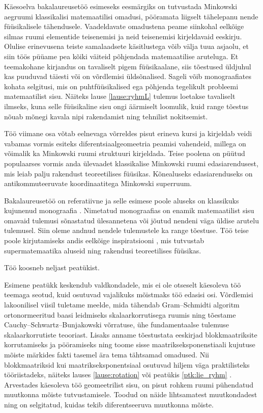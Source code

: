 \documentclass[12pt,a4paper,oneside]{article}
\theoremstyle{plain}
\theoremstyle{definition}
\numberwithin{equation}{section}
\begin{document}
Käesoelva bakalaureusetöö esimeseks eesmärgiks on 
tutvustada Minkowski aeg\-ruumi klassikalisi matemaatilisi 
omadusi, pööramata liigselt tähelepanu nende füü\-sikalisele 
tähendusele. Vaadeldavate omadustena peame siinkohal 
eelkõige silmas ruumi elementide teisenemisi ja neid 
teisenemisi kirjeldavaid eeskirju. 
Olulise erinevusena teiste samalaadsete käsitlustega võib 
välja tuua asjaolu, et siin töös püüame pea kõiki väiteid 
põhjendada matemaatilise aruteluga. Et teemakohane kirjandus 
on tavaliselt pigem füüsikaalane, siis tõestused üldjuhul kas 
puuduvad täiesti või on võrdlemisi üldsõnalised. Sageli võib 
monograafiates kohata selgitusi, mis on puhtfüüsikalised ega 
põhjenda tegelikult probleemi matemaatilist \mbox{sisu}. Näiteks \mbox{lause}
\ref{lause:ryhmL} tulemus loetakse tavaliselt ilmseks, kuna 
selle füüsikaline sisu \mbox{ongi} äärmiselt loomulik, kuid range 
tõestus nõuab mõnegi kavala nipi rakendamist ning tehnilist 
nokitsemist. 

Töö viimane osa võtab eelnevaga võrreldes pisut erineva kursi 
ja kirjeldab \mbox{veidi} vabamas vormis esiteks diferentsiaalgeomeetria 
peamisi vahendeid, millega on võimalik ka Minkowski ruumi 
struktuuri kirjeldada. Teise poolena on püütud populaarses 
vormis anda ülevaadet klassikalise Minkowski ruumi 
edasiarendusest, mis leiab palju rakendust teoreetilises 
füüsikas. Kõnealuseks edasiarenduseks on antikommuteeruvate 
koordinaatitega Minkowski superruum.

Bakalaureusetöö on referatiivne ja selle esimese poole aluseks 
on klassikuks kuju\-nenud monograafia \cite{Naber}. Nimetatud monograafias
on enamik matemaatilist sisu omavaid tulemusi sõnastatud 
ülesannetena või jõutud nendeni väga üldise arutelu tulemusel. 
Siin oleme andnud nendele tulemustele ka range tõestuse. Töö 
teise poole kirjutamiseks andis eelkõige inspiratsiooni 
\cite{Super}, mis tutvustab super\-matemaatika aluseid ning 
rakendusi teoreetilises füüsikas.

Töö koosneb neljast peatükist.

Esimene peatükk keskendub valdkondadele, mis ei ole otseselt 
käesoleva töö \mbox{teemaga} seotud, kuid osutuvad vajalikuks 
mõistmaks töö edasisi osi. Võrdlemisi lakoonilisel 
viisil tuletame meelde, mida tähendab Gram--Schmidti algoritm 
ortonormeeritud baasi leidmiseks skalaarkorrutisega ruumis ning 
tõestame Cauchy--Schwartz--Bunjakowski võrratuse, ühe 
fundamentaalse tulemuse skalaarkorrutiste teooriast. Lisaks 
anname tõestustata eeskirjad blokkmaatriksite korrutamiseks 
ja pööramiseks ning toome sisse maatrikseksponenstiaali kujutuse 
mõiste märkides fakti tasemel ära tema tähtsamad omadused. 
Nii blokkmaatriksid kui maatriks\-eksponentsiaal osutuvad hiljem 
väga praktilisteks tööriistadeks, näiteks lauses 
\ref{lause:rotation} või peatükis \ref{ptk:lie_ryhm} 
. Arvestades käesoleva 
töö geomeetrilist sisu, on pisut rohkem ruumi pühendatud 
muutkonna mõiste tutvustamisele. Toodud on näide lihtsamatest 
muutkondadest ning on selgitatud, kuidas tekib diferentseeruva 
\mbox{muutkonna} mõiste.
\end{document}
